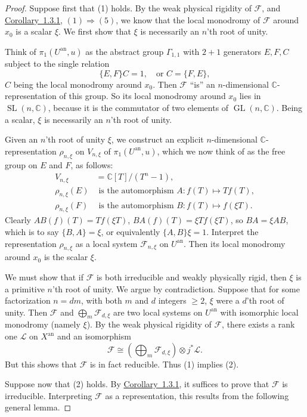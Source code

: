 \begin{proof}
Suppose first that (1) holds. By the weak physical rigidity of
\(\mathcal{F}\), and \hyperref[cor:1.3.1]{Corollary~1.3.1}, \((1)\Rightarrow(5)\), we know that the local
monodromy of \(\mathcal{F}\) around \(x_0\) is a scalar \(\xi\). We first show
that \(\xi\) is necessarily an \(n\)'th root of unity.

Think of \(\pi_1(U^{\mathrm{an}},u)\) as the abstract group \(\Gamma_{1,1}\)
with \(2+1\) generators \(E,F,C\) subject to the single relation
\[
  \{E,F\}C=1,\quad\text{or }C=\{F,E\},
\]
\(C\) being the local monodromy around \(x_0\). Then \(\mathcal{F}\) ``is'' an
\(n\)-dimensional \(\mathbb{C}\)-representation of this group. So its local
monodromy around \(x_0\) lies in \(\operatorname{SL}(n,\mathbb{C})\), because
it is the commutator of two elements of \(\operatorname{GL}(n,\mathbb{C})\).
Being a scalar, \(\xi\) is necessarily an \(n\)'th root of unity.

Given an \(n\)'th root of unity \(\xi\), we construct an explicit
\(n\)-dimensional \(\mathbb{C}\)-representation \(\rho_{n,\xi}\) on
\(V_{n,\xi}\) of \(\pi_1(U^{\mathrm{an}},u)\), which we now think of as the
free group on \(E\) and \(F\), as follows:
\[
  \begin{aligned}
  V_{n,\xi}&=\mathbb{C}[T]/(T^n-1),\\
  \rho_{n,\xi}(E)&\text{ is the automorphism }A:f(T)\mapsto Tf(T),\\
  \rho_{n,\xi}(F)&\text{ is the automorphism }B:f(T)\mapsto f(\xi T).
  \end{aligned}
\]
Clearly \(AB(f)(T)=Tf(\xi T)\), \(BA(f)(T)=\xi Tf(\xi T)\), so
\(BA=\xi AB\), which is to say \(\{B,A\}=\xi\), or equivalently
\(\{A,B\}\xi=1\). Interpret the representation \(\rho_{n,\xi}\) as a local
system \(\mathcal{F}_{n,\xi}\) on \(U^{\mathrm{an}}\). Then its local monodromy
around \(x_0\) is the scalar \(\xi\).

We must show that if \(\mathcal{F}\) is both irreducible and weakly physically
rigid, then \(\xi\) is a primitive \(n\)'th root of unity. We argue by
contradiction. Suppose that for some factorization \(n=dm\), with both \(m\) and
\(d\) integers \(\geq 2\), \(\xi\) were a \(d\)'th root of unity. Then
\(\mathcal{F}\) and \(\bigoplus_m \mathcal{F}_{d,\xi}\) are two local systems on
\(U^{\mathrm{an}}\) with isomorphic local monodromy (namely \(\xi\)). By the
weak physical rigidity of \(\mathcal{F}\), there exists a rank one
\(\mathcal{L}\) on \(X^{\mathrm{an}}\) and an isomorphism
\[
  \mathcal{F}\cong \left(\bigoplus_m\mathcal{F}_{d,\xi}\right)\otimes j^*\mathcal{L}.
\]
But this shows that \(\mathcal{F}\) is in fact reducible. Thus (1) implies (2).

Suppose now that (2) holds. By \hyperref[cor:1.3.1]{Corollary~1.3.1}, it suffices to prove that
\(\mathcal{F}\) is irreducible. Interpreting \(\mathcal{F}\) as a
representation, this results from the following general lemma.
\end{proof}

